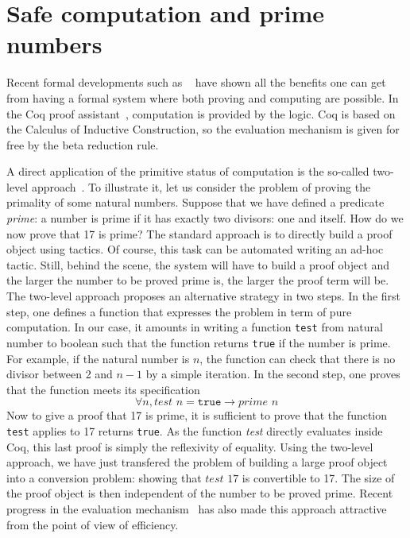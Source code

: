 

\section{Safe computation and prime numbers}

Recent formal developments such as ~\cite{4color,kepler} have shown all the benefits
one can get from having a formal system where both proving and computing are
possible. In the {\sc Coq} proof assistant~\cite{Coq}, computation is
provided by the logic. {\sc Coq} is based on the Calculus of 
Inductive Construction, so the evaluation mechanism is given for free
by the beta reduction rule. 

A direct application of the primitive status of computation is 
the so-called two-level approach~\cite{boutin}. To illustrate it, 
let us consider the problem of proving the primality of some natural 
numbers.
Suppose that we have defined a predicate {\it prime}: a number is prime 
if it has exactly two divisors: one and itself. 
How do we now prove that 17 is prime? The standard approach is to
directly build a proof object using tactics. Of course, this task can be 
automated writing an ad-hoc tactic. Still, behind the scene, the system 
will have to build a proof object and the larger the number to be proved
prime is, the larger the proof term will be.
The two-level approach proposes an alternative
strategy in two steps. In the first step, one defines a function that expresses
the problem in term of pure computation. In our case, it amounts in writing a 
function {\tt test} from natural number to boolean such that the function
returns {\tt true} if the number is prime. For example, if the natural number
is $n$, the function can check that there is no divisor between 2 and $n-1$
by a simple iteration. In the second step, one proves that the function meets 
its specification
$$
\forall n, \textit{test}\,\, n = \texttt{true} \rightarrow \textit{prime}\,\, n
$$
Now to give a proof that 17 is prime, it is sufficient to prove that the function
{\tt test} applies to 17 returns {\tt true}. As the function {\it test} directly
evaluates inside {\sc Coq}, this last proof is simply the reflexivity of equality.
Using the two-level approach, we have just transfered the problem of building a 
large proof object into a conversion problem: showing that $test\,\, 17$ is convertible
to 17.  The size of the proof object is then independent of the number to be proved
prime. Recent progress in the evaluation mechanism~\cite{GreLer} has also made this
approach attractive from the point of view of efficiency.

